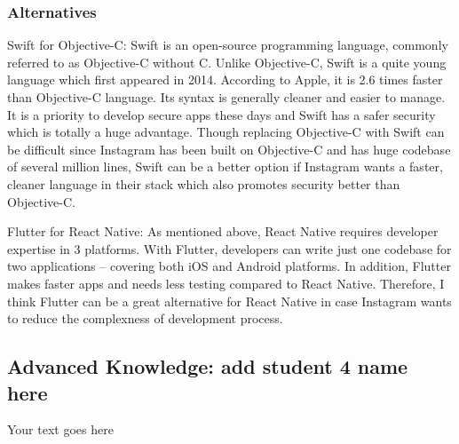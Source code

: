 \documentclass[a4paper, 11pt]{report}
\begin{document}
\subsubsection{Alternatives}
Swift for Objective-C: Swift is an open-source programming language, commonly referred to as Objective-C without C\cite{ky10}. Unlike Objective-C, Swift is a quite young language which first appeared in 2014. According to Apple, it is 2.6 times faster than Objective-C language. Its syntax is generally cleaner and easier to manage. It is a priority to develop secure apps these days and Swift has a safer security which is totally a huge advantage. Though replacing Objective-C with Swift can be difficult since Instagram has been built on Objective-C and has huge codebase of several million lines, Swift can be a better option if Instagram wants a faster, cleaner language in their stack which also promotes security better than Objective-C.

Flutter for React Native: As mentioned above, React Native requires developer expertise in 3 platforms. With Flutter, developers can write just one codebase for two applications – covering both iOS and Android platforms\cite{ky11}. In addition, Flutter makes faster apps and needs less testing compared to React Native. Therefore, I think Flutter can be a great alternative for React Native in case Instagram wants to reduce the complexness of development process.

\subsection{Advanced Knowledge: add student 4 name here}

Your text goes here




\newpage



\end{document}
